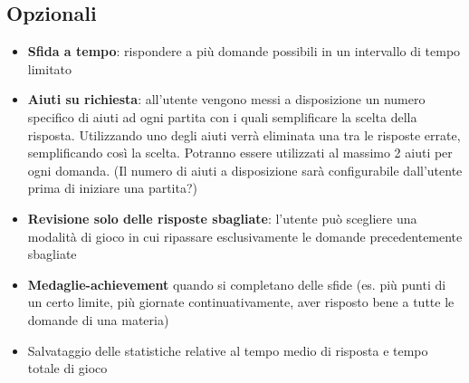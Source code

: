         \subsection{Opzionali} \label{chap:req_non_funzionali}
        \begin{itemize}
            \item \textbf{Sfida a tempo}: rispondere a più domande possibili in un intervallo di tempo limitato
            \item \textbf{Aiuti su richiesta}: all’utente vengono messi a disposizione un numero specifico di aiuti ad ogni partita con i quali semplificare la scelta della risposta. Utilizzando uno degli aiuti verrà eliminata una tra le risposte errate, semplificando così la scelta. Potranno essere utilizzati al massimo 2 aiuti per ogni domanda. (Il numero di aiuti a disposizione sarà configurabile dall'utente prima di iniziare una partita?)
            \item \textbf{Revisione solo delle risposte sbagliate}: l’utente può scegliere una modalità di gioco in cui ripassare esclusivamente le domande precedentemente sbagliate
            \item \textbf{Medaglie-achievement} quando si completano delle sfide (es. più punti di un certo limite, più giornate continuativamente, aver risposto bene a tutte le domande di una materia)
            \item Salvataggio delle statistiche relative al tempo medio di risposta e tempo totale di gioco
        \end{itemize}
